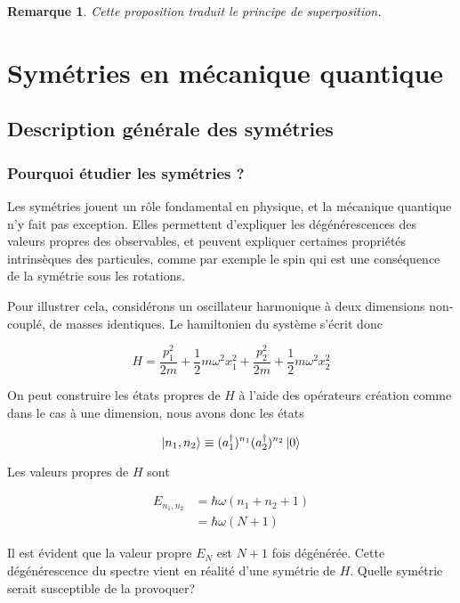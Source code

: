 \documentclass[11pt,twoside,a4paper]{report}
\numberwithin{equation}{part}
\newtheorem{remark}[theorem]{Remarque}
\begin{document}
\begin{remark}
    Cette proposition traduit le principe de superposition.
\end{remark}


\part{Symétries en mécanique quantique}

\chapter{Description générale des symétries}

\section{Pourquoi étudier les symétries ?}

Les symétries jouent un rôle fondamental en physique, et la mécanique quantique n'y fait pas exception. Elles permettent d'expliquer les dégénérescences des valeurs propres des observables, et peuvent expliquer certaines propriétés intrinsèques des particules, comme par exemple le spin qui est une conséquence de la symétrie sous les rotations.

Pour illustrer cela, considérons un oscillateur harmonique à deux dimensions non-couplé, de masses identiques. Le hamiltonien du système s'écrit donc

\begin{equation}
  H = \frac{p_1^2}{2m} + \frac{1}{2}m\omega^2x_1^2 + \frac{p_2^2}{2m} + \frac{1}{2}m\omega^2x_2^2
\end{equation}

On peut construire les états propres de $H$ à l'aide des opérateurs création comme dans le cas à une dimension, nous avons donc les états 

\begin{equation}
  \ket{n_1, n_2} \equiv (a_1^\dagger)^{n_1} (a_2^\dagger)^{n_2} \ket{0}
\end{equation}

Les valeurs propres de $H$ sont

\begin{align}
  E_{n_1, n_2} &= \hbar\omega(n_1 + n_2 + 1) \\
  &= \hbar\omega (N+1)
\end{align}

Il est évident que la valeur propre $E_N$ est $N+1$ fois dégénérée. Cette dégénérescence du spectre vient en réalité d'une symétrie de $H$. Quelle symétrie serait susceptible de la provoquer?
\end{document}
